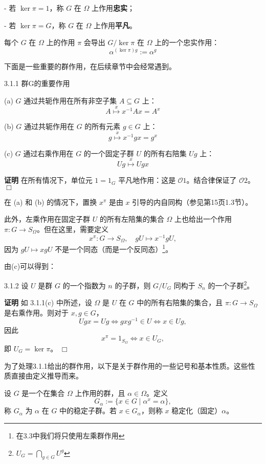 \documentclass[UTF8]{ctexart}
\begin{document}
- 若 $\ker \pi = 1$，称 $G$ 在 $\Omega$ 上作用\textbf{忠实}；

- 若 $\ker \pi = G$，称 $G$ 在 $\Omega$ 上作用\textbf{平凡}。

每个 $G$ 在 $\Omega$ 上的作用 $\pi$ 会导出 $G / \ker \pi$ 在 $\Omega$ 上的一个忠实作用：
$$
    \alpha^{(\ker \pi) g} := \alpha^g
$$

下面是一些重要的群作用，在后续章节中会经常遇到。


3.1.1 群G的重要作用


(a) $G$ 通过共轭作用在所有非空子集 $A \subseteq G$ 上：
$$
    A \overset{x}{\mapsto} x^{-1} A x = A^x
$$

(b) $G$ 通过共轭作用在 $G$ 的所有元素 $g \in G$ 上：
$$
    g \overset{x}{\mapsto} x^{-1} g x = g^x
$$

(c) $G$ 通过右乘作用在 $G$ 的一个固定子群 $U$ 的所有右陪集 $Ug$ 上：
$$
    Ug \overset{x}{\mapsto} Ugx
$$



\textbf{证明}
在所有情况下，单位元 $1 = 1_G$ 平凡地作用：这是 $\mathcal{O}1$。结合律保证了 $\mathcal{O}2$。 $\Box$

在 (a) 和 (b) 的情况下，置换 $x^\pi$ 是由 $x$ 引导的内自同构（参见第15页1.3节）。

此外，左乘作用在固定子群 $U$ 的所有左陪集的集合 $\Omega$ 上也给出一个作用 $\pi: G \to S_\Omega$。但在这里，需要定义
$$
    x^\pi : G \to S_\Omega, \quad gU \mapsto x^{-1} gU,
$$
因为 $gU \mapsto xgU$ 不是一个同态（而是一个反同态）\footnote[2]{在3.3中我们将只使用左乘群作用}。


由(c)可以得到：


3.1.2
设 $U$ 是群 $G$ 的一个指数为 $n$ 的子群，则 $G / U_G$ 同构于 $S_n$ 的一个子群\footnote[3]{$U_G=\bigcap_{g\in G} U^g$}。

\textbf{证明}
如 3.1.1(c) 中所述，设 $\Omega$ 是 $U$ 在 $G$ 中的所有右陪集的集合，且 $\pi: G \to S_\Omega$ 是右乘作用。则对于 $x, g \in G$，
$$
    Ugx = Ug \iff gxg^{-1} \in U \iff x \in Ug,
$$
因此
$$
    x^\pi = 1_{S_\Omega} \iff x \in U_G,
$$
即 $U_G = \ker \pi$。 $\Box$



为了处理3.1.1给出的群作用，以下是关于群作用的一些记号和基本性质。这些性质直接由定义推导而来。

设 $G$ 是一个在集合 $\Omega$ 上作用的群，且 $\alpha \in \Omega$。定义
$$
    G_\alpha := \{x \in G \mid \alpha^x = \alpha\},
$$
称 $G_\alpha$ 为 $\alpha$ 在 $G$ 中的稳定子群。若 $x \in G_\alpha$，则称 $x$ 稳定化（固定）$\alpha$。
\end{document}

